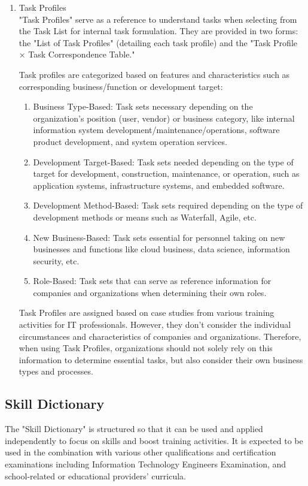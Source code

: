 \begin{enumerate}
\newpage
\item Task Profiles \\
"Task Profiles" serve as a reference to understand tasks when selecting from the Task List for internal task formulation. They are provided in two forms: the "List of Task Profiles" (detailing each task profile) and the "Task Profile × Task Correspondence Table."

Task profiles are categorized based on features and characteristics such as corresponding business/function or development target:
\begin{enumerate}
    \item Business Type-Based: Task sets necessary depending on the organization's position (user, vendor) or business category, like internal information system development/maintenance/operations, software product development, and system operation services.
    \item Development Target-Based: Task sets needed depending on the type of target for development, construction, maintenance, or operation, such as application systems, infrastructure systems, and embedded software.
    \item Development Method-Based: Task sets required depending on the type of development methods or means such as Waterfall, Agile, etc.
    \item New Business-Based: Task sets essential for personnel taking on new businesses and functions like cloud business, data science, information security, etc.
    \item Role-Based: Task sets that can serve as reference information for companies and organizations when determining their own roles.
\end{enumerate}
Task Profiles are assigned based on case studies from various training activities for IT professionals. However, they don't consider the individual circumstances and characteristics of companies and organizations. Therefore, when using Task Profiles, organizations should not solely rely on this information to determine essential tasks, but also consider their own business types and processes.

\end{enumerate}

\newpage
\subsection{Skill Dictionary}
The "Skill Dictionary" is structured so that it can be used and applied independently to focus on skills and
boost training activities. It is expected to be used in the combination with various other qualifications and
certification examinations including Information Technology Engineers Examination, and school-related or
educational providers' curricula.


